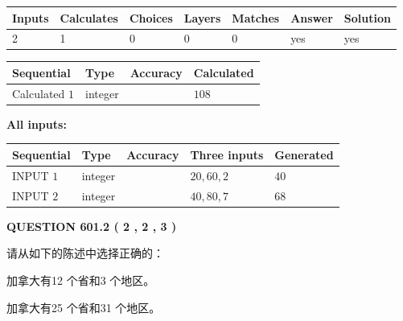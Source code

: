 \documentclass{ctexart}
\begin{document}
 
   
   
   
   
\noindent\begin{tabular}{|l|l|l|l|l|l|l|}
 \hline
Inputs & Calculates & Choices & Layers & Matches & Answer & Solution \\ \hline
 2  & 
 1  & 
 0
  & 
 0  & 
 0  & 
  yes & 
  yes 
  \\ \hline
 \end{tabular}
   
   
   
   
\noindent{}
   
   
  
  
\noindent\begin{tabular}{|l|l|l|l|}
\hline
 Sequential & Type & Accuracy & Calculated \\ 
\hline
 
 
  Calculated $  1 $ & integer &  & 
  $ 108 $ 
 \\  \hline  
 \end{tabular}
   
   
   
   
\noindent\vspace{0.1in}\hspace{-0.08in} {\textbf{\Large{All inputs: }}}
   
   
  
  
\noindent\begin{tabular}{|l|l|l|l|l|}
\hline
 Sequential & Type & Accuracy & Three inputs & Generated \\ 
\hline
 
 
  INPUT $  1 $ & integer &  & $
 20
 , 
 60
 , 
 2
 $ & $ 40 $ 
 \\  \hline  
 
 
  INPUT $  2 $ & integer &  & $
 40
 , 
 80
 , 
 7
 $ & $ 68 $ 
 \\  \hline  
 \end{tabular}
   
   
  
\vspace{0.2in}
  
{\textbf{\Large{QUESTION
601.2 
 ( 2 , 2 , 3 )
}}}
  
  
请从如下的陈述中选择正确的：
 
 
加拿大有12 个省和3 个地区。
 
 
加拿大有25 个省和31 个地区。
 
\end{document}
